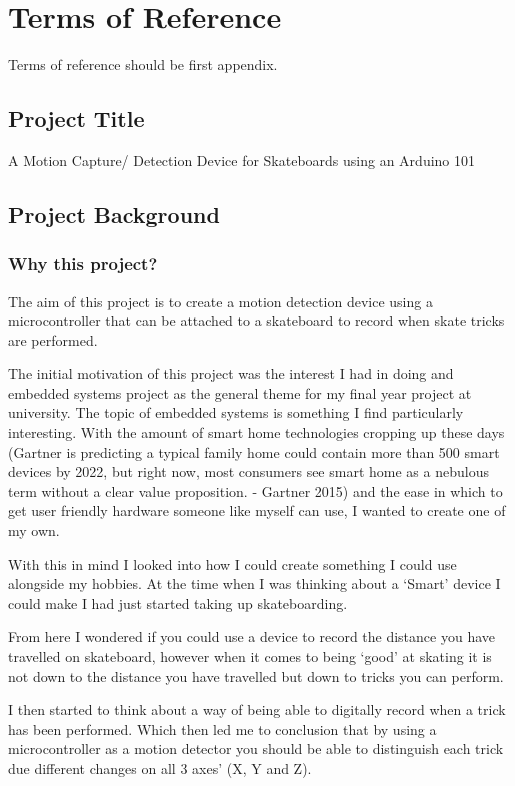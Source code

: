 \chapter{Terms of Reference}\label{tor}

Terms of reference should be first appendix.
\section{Project Title}\label{tor:title}
A Motion Capture/ Detection Device for Skateboards using an Arduino 101
\section{Project Background}\label{tor:background}
\subsection{Why this project?}\label{tor:whythisproject}
The aim of this project is to create a motion detection device using a microcontroller that can be attached to a skateboard to record when skate tricks are performed. 

The initial motivation of this project was the interest I had in doing and embedded systems project as the general theme for my final year project at university. The topic of embedded systems is something I find particularly interesting. With the amount of smart home technologies cropping up these days (Gartner is predicting a typical family home could contain more than 500 smart devices by 2022, but right now, most consumers see smart home as a nebulous term without a clear value proposition. - Gartner 2015) and the ease in which to get user friendly hardware someone like myself can use, I wanted to create one of my own.  

With this in mind I looked into how I could create something I could use alongside my hobbies. At the time when I was thinking about a ‘Smart’ device I could make I had just started taking up skateboarding. 

From here I wondered if you could use a device to record the distance you have travelled on skateboard, however when it comes to being ‘good’ at skating it is not down to the distance you have travelled but down to tricks you can perform. 

I then started to think about a way of being able to digitally record when a trick has been performed. Which then led me to conclusion that by using a microcontroller as a motion detector you should be able to distinguish each trick due different changes on all 3 axes’ (X, Y and Z).


